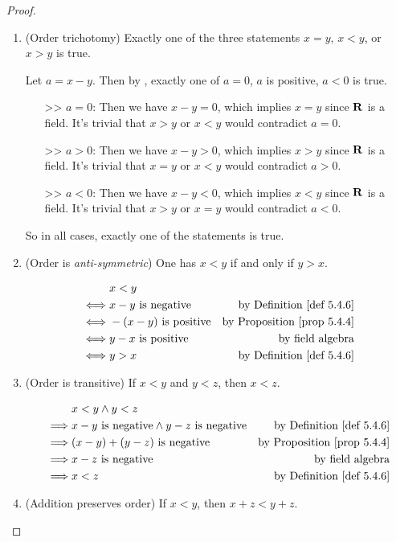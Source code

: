 \begin{proof}
\begin{enumerate}
    \item (Order trichotomy) Exactly one of the three statements \(x = y\), \(x < y\), or \(x > y\) is true.

        Let \(a = x - y\). Then by , exactly one of \(a = 0\), \(a\) is positive, \(a < 0\) is true.
        \begin{itemize}
            \item [>>] \(a = 0\):
                Then we have \(x - y = 0\), which implies \(x = y\) since \(\mathbf{R}\) is a field.
                It's trivial that \(x > y\) or \(x < y\) would contradict \(a = 0\).
            \item [>>] \(a > 0\):
                Then we have \(x - y > 0\), which implies \(x > y\) since \(\mathbf{R}\) is a field.
                It's trivial that \(x = y\) or \(x < y\) would contradict \(a > 0\).
            \item [>>] \(a < 0\):
                Then we have \(x - y < 0\), which implies \(x < y\) since \(\mathbf{R}\) is a field.
                It's trivial that \(x > y\) or \(x = y\) would contradict \(a < 0\).
        \end{itemize}
        So in all cases, exactly one of the statements is true.
    \item (Order is \emph{anti-symmetric}) One has \(x < y\) if and only if \(y > x\).

        \begin{align*}
                 & x < y \\
            \iff & x - y \text{ is negative} & \text{by \DEF{5.4.6}} \\
            \iff & -(x - y) \text{ is positive} & \text{by \PROP{5.4.4}} \\
            \iff & y - x \text{ is positive} & \text{by field algebra} \\
            \iff & y > x & \text{by \DEF{5.4.6}}
        \end{align*}
    \item (Order is transitive) If \(x < y\) and \(y < z\), then \(x < z\).

        \begin{align*}
                     & x < y \land y < z \\
            \implies & x - y \text{ is negative} \land y - z \text{ is negative} & \text{by \DEF{5.4.6}} \\
            \implies & (x - y) + (y - z) \text{ is negative} & \text{by \PROP{5.4.4}} \\
            \implies & x - z \text{ is negative} & \text{by field algebra} \\
            \implies & x < z & \text{by \DEF{5.4.6}}
        \end{align*}
    \item (Addition preserves order) If \(x < y\), then \(x + z < y + z\).


\end{enumerate}
\end{proof}
